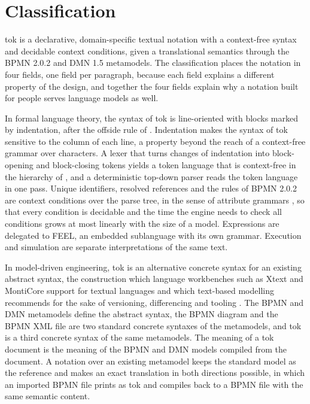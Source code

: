 \documentclass[11pt,a4paper]{article}
\begin{document}
\section{Classification}\label{sec:classification}

tok is a declarative, domain-specific textual notation \citep{Mernik2005} with a context-free syntax and decidable context conditions, given a translational semantics through the BPMN 2.0.2 and DMN 1.5 metamodels. The classification places the notation in four fields, one field per paragraph, because each field explains a different property of the design, and together the four fields explain why a notation built for people serves language models as well.

In formal language theory, the syntax of tok is line-oriented with blocks marked by indentation, after the offside rule of \citet{Landin1966}. Indentation makes the syntax of tok sensitive to the column of each line, a property beyond the reach of a context-free grammar over characters. A lexer that turns changes of indentation into block-opening and block-closing tokens yields a token language that is context-free in the hierarchy of \citet{Chomsky1956}, and a deterministic top-down parser reads the token language in one pass. Unique identifiers, resolved references and the rules of BPMN 2.0.2 are context conditions over the parse tree, in the sense of attribute grammars \citep{Knuth1968}, so that every condition is decidable and the time the engine needs to check all conditions grows at most linearly with the size of a model. Expressions are delegated to FEEL, an embedded sublanguage with its own grammar. Execution and simulation are separate interpretations of the same text.

In model-driven engineering, tok is an alternative concrete syntax for an existing abstract syntax, the construction which language workbenches such as Xtext and MontiCore support for textual languages \citep{Eysholdt2010xtext,Krahn2010monticore} and which text-based modelling recommends for the sake of versioning, differencing and tooling \citep{Gronniger2014textbased}. The BPMN and DMN metamodels define the abstract syntax, the BPMN diagram and the BPMN XML file are two standard concrete syntaxes of the metamodels, and tok is a third concrete syntax of the same metamodels. The meaning of a tok document is the meaning of the BPMN and DMN models compiled from the document. A notation over an existing metamodel keeps the standard model as the reference and makes an exact translation in both directions possible, in which an imported BPMN file prints as tok and compiles back to a BPMN file with the same semantic content.
\end{document}
